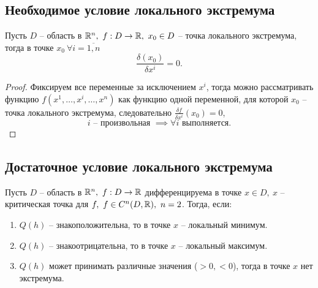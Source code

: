 \setcounter{subsection}{11}

\subsection{Необходимое условие локального экстремума}

\begin{theorem}
    Пусть $D$ -- область в $ \mathbb{R}^n, \ f:D \rightarrow\mathbb{R}, \ x_0 \in D $ -- точка локального экстремума, тогда в точке $ x_0 \ \forall i = \overline{1,n}$
    \[
        \frac{\delta(x_0)}{\delta x^i} = 0.
    \]
\end{theorem}

\begin{proof}
    Фиксируем все переменные за исключением $ x^i $, тогда можно рассматривать функцию $ f(x^1,\ldots,x^i,\ldots,x^n) $ как функцию одной переменной, для которой $ x_0 $ -- точка локального экстремума, следовательно $ \frac{\delta f}{\delta x^i}(x_0) = 0 $,
    \[
        i \text{ -- произвольная }\implies \forall i \text{ выполняется}.
    \]
\end{proof}

\setcounter{subsection}{13}

\subsection{Достаточное условие локального экстремума}

\begin{theorem}
    Пусть $D$ -- область в $\mathbb{R}^n, \ f: D \rightarrow \mathbb{R}$ дифференцируема в точке $x \in D, \ x$ -- критическая точка для $f, \ f \in C^n(D,\mathbb{R}), \ n = 2$. Тогда, если:
    \begin{enumerate}
        \item $Q(h)$ -- знакоположительна, то в точке $x$ -- локальный минимум.
        \item $Q(h)$ -- знакоотрицательна, то в точке $x$ -- локальный максимум.
        \item $Q(h)$ может принимать различные значения ($>0, < 0$), тогда в точке $x$ нет экстремума.
    \end{enumerate}
\end{theorem}

